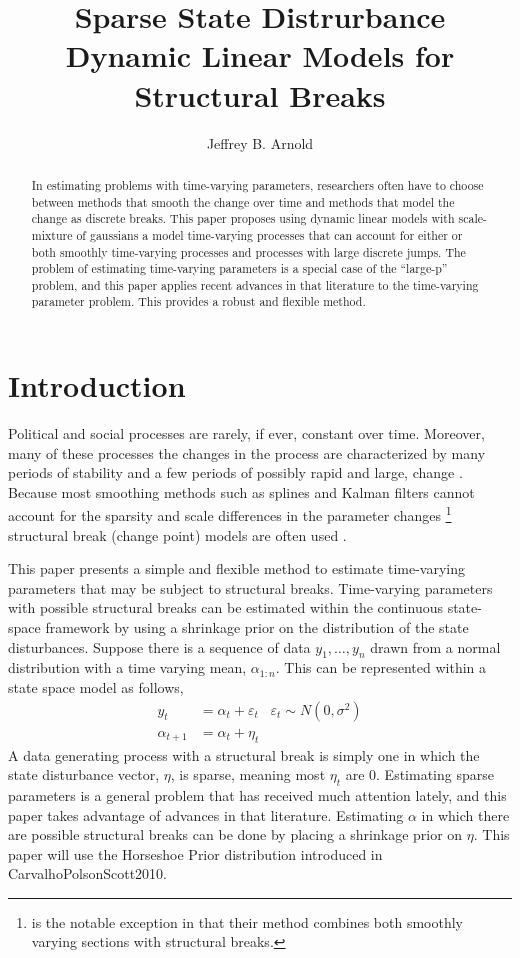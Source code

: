 \documentclass{article}
\author{Jeffrey B. Arnold}
\title{Sparse State Distrurbance Dynamic Linear Models for Structural Breaks}
\begin{document}
\maketitle{}

\begin{abstract}
  In estimating problems with time-varying parameters, researchers often have to choose between methods that smooth the change over time and methods that model the change as discrete breaks.
  This paper proposes using dynamic linear models with scale-mixture of gaussians a model time-varying processes that can account for either or both smoothly time-varying processes and processes with large discrete jumps.
  The problem of estimating time-varying parameters is a special case of the ``large-p'' problem, and this paper applies recent advances in that literature to the time-varying parameter problem.
  This provides a robust and flexible method. 
\end{abstract}

\section{Introduction}
\label{sec:introduction}

Political and social processes are rarely, if ever, constant over time.
Moreover, many of these processes the changes in the process are characterized by many periods of stability and a few periods of possibly rapid and large, change \parencite{RatkovicEng2010}.
Because most smoothing methods such as splines and Kalman filters cannot account for the sparsity and scale differences in the parameter changes
\footnote{\textcite{RatkovicEng2010} is the notable exception in that their method combines both smoothly varying sections with structural breaks.}
structural break (change point) models are often used \parencites{CalderiaZorn1998}{Spirling2007}{Spirling2007a}{Park2010}{Park2011}.%

This paper presents a simple and flexible method to estimate time-varying parameters that may be subject to structural breaks.
Time-varying parameters with possible structural breaks can be estimated within the continuous state-space framework by using a shrinkage prior on the distribution of the state disturbances.
Suppose there is a sequence of data $y_{1}, \dots, y_{n}$ drawn from a normal distribution with a time varying mean, $\alpha_{1:n}$. This can be represented within a state space model as follows,
\begin{align}
  \label{eq:4}
  y_{t} &= \alpha_{t} + \varepsilon_{t} & \varepsilon_{t} \sim N(0, \sigma^{2}) \\
  \alpha_{t + 1} &= \alpha_{t} + \eta_{t}
\end{align}
A data generating process with a structural break is simply one in which the state disturbance vector, $\eta$, is sparse, meaning most $\eta_{t}$ are 0.
Estimating sparse parameters is a general problem that has received much attention lately, and this paper takes advantage of advances in that literature.
Estimating $\alpha$ in which there are possible structural breaks can be done by placing a shrinkage prior on $\eta$.
This paper will use the Horseshoe Prior distribution introduced in \textcite{CarvalhoPolsonScott2009}{CarvalhoPolsonScott2010}.
\end{document}
